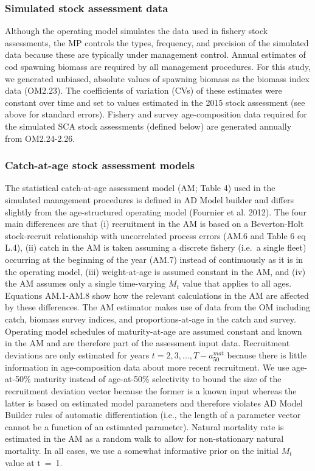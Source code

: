 \documentclass[12pt,]{article}
\begin{document}
\subsubsection{Simulated stock assessment
data}\label{simulated-stock-assessment-data}

Although the operating model simulates the data used in fishery stock
assessments, the MP controls the types, frequency, and precision of the
simulated data because these are typically under management control.
Annual estimates of cod spawning biomass are required by all management
procedures. For this study, we generated unbiased, absolute values of
spawning biomass as the biomass index data (OM2.23). The coefficients of
variation (CVs) of these estimates were constant over time and set to
values estimated in the 2015 stock assessment (see above for standard
errors). Fishery and survey age-composition data required for the
simulated SCA stock assessments (defined below) are generated annually
from OM2.24-2.26.

\subsubsection{Catch-at-age stock assessment
models}\label{catch-at-age-stock-assessment-models}

The statistical catch-at-age assessment model (AM; Table 4) used in the
simulated management procedures is defined in AD Model builder and
differs slightly from the age-structured operating model (Fournier et
al. 2012). The four main differences are that (i) recruitment in the AM
is based on a Beverton-Holt stock-recruit relationship with uncorrelated
process errors (AM.6 and Table 6 eq L.4), (ii) catch in the AM is taken
assuming a discrete fishery (i.e.~a single fleet) occurring at the
beginning of the year (AM.7) instead of continuously as it is in the
operating model, (iii) weight-at-age is assumed constant in the AM, and
(iv) the AM assumes only a single time-varying \(M_t\) value that
applies to all ages. Equations AM.1-AM.8 show how the relevant
calculations in the AM are affected by these differences. The AM
estimator makes use of data from the OM including catch, biomass survey
indices, and proportions-at-age in the catch and survey. Operating model
schedules of maturity-at-age are assumed constant and known in the AM
and are therefore part of the assessment input data. Recruitment
deviations are only estimated for years \(t = 2,3,...,T - a_{50}^{mat}\)
because there is little information in age-composition data about more
recent recruitment. We use age-at-50\% maturity instead of age-at-50\%
selectivity to bound the size of the recruitment deviation vector
because the former is a known input whereas the latter is based on
estimated model parameters and therefore violates AD Model Builder rules
of automatic differentiation (i.e., the length of a parameter vector
cannot be a function of an estimated parameter). Natural mortality rate
is estimated in the AM as a random walk to allow for non-stationary
natural mortality. In all cases, we use a somewhat informative prior on
the initial \(M_t\) value at t~=~1.
\end{document}
